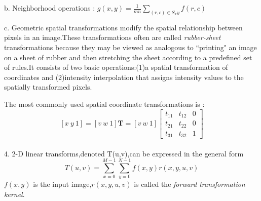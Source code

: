 \documentclass[12pt]{article}
\begin{document}
b. Neighborhood operations : $g(x,y)=\frac{1}{mn} \sum_{(r,c)\in S_xy} f(r,c)$

c. Geometric spatial transformations modify the spatial relationship between pixels in an image.These transformations often are called \textsl{rubber-sheet} transformations because they may be viewed as analogous to ``printing" an image on a sheet of rubber and then stretching the sheet according to a predefined set of rules.It consists of two basic operations:(1)a spatial transformation of coordinates and (2)intensity interpolation that assigns intensity values to the spatially transformed pixels.

The most commonly used spatial coordinate transformations is :
\[
[x\ y\ 1]=[v\ w\ 1]\textbf{T}=[v\ w\ 1] \left[\begin{array}{ccc}
t_{11} & t_{12} & 0\\
t_{21} & t_{22} & 0\\
t_{31} & t_{32} & 1
\end{array}\right] 
\]
\\
4. 2-D linear transforms,denoted T(u,v),can be expressed in the general form
\[
T(u,v)=\sum_{x=0}^{M-1} \sum_{y=0}^{N-1} f(x,y)r(x,y,u,v)
\]
$f(x,y)$ is the input image,$r(x,y,u,v)$ is called the \textsl{forward transformation kernel}.
\end{document}
